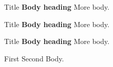 
\begin{note}{Title}%
  {\bfseries Body heading} More body.
\end{note}

\begin{note}{Title}%
  {\bfseries Body heading} More body.
\end{note}

\begin{note}[Shown]{Title}%
  {\bfseries Body heading} More body.
\end{note}


\begin{mixed}{First}%
  {Second}
  Body.
\end{mixed}
